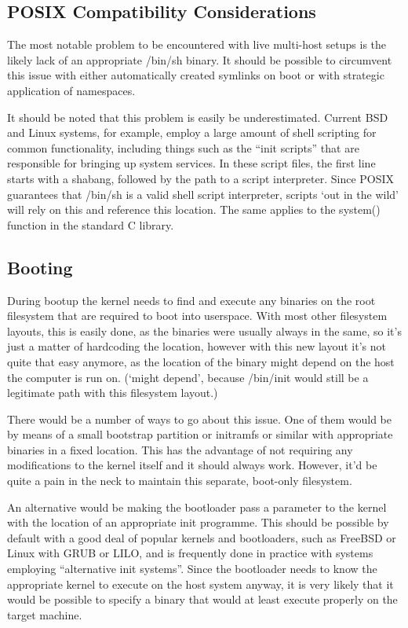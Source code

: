 \documentclass[a4paper,twoside,titlepage]{article}
\begin{document}
\subsection{POSIX Compatibility Considerations}
The most notable problem to be encountered with live multi-host setups is the
likely lack of an appropriate /bin/sh binary. It should be possible to
circumvent this issue with either automatically created symlinks on boot or
with strategic application of namespaces.

It should be noted that this problem is easily be underestimated. Current BSD
and Linux systems, for example, employ a large amount of shell scripting for
common functionality, including things such as the ``init scripts'' that are
responsible for bringing up system services. In these script files, the first
line starts with a shabang, followed by the path to a script interpreter. Since
POSIX guarantees that /bin/sh is a valid shell script interpreter, scripts `out
in the wild' will rely on this and reference this location. The same applies to
the system() function in the standard C library.

\subsection{Booting}
During bootup the kernel needs to find and execute any binaries on the root
filesystem that are required to boot into userspace. With most other filesystem
layouts, this is easily done, as the binaries were usually always in the same,
so it's just a matter of hardcoding the location, however with this new layout
it's not quite that easy anymore, as the location of the binary might depend on
the host the computer is run on. (`might depend', because /bin/init would still
be a legitimate path with this filesystem layout.)

There would be a number of ways to go about this issue. One of them would be
by means of a small bootstrap partition or initramfs or similar with appropriate
binaries in a fixed location. This has the advantage of not requiring any
modifications to the kernel itself and it should always work. However, it'd be
quite a pain in the neck to maintain this separate, boot-only filesystem.

An alternative would be making the bootloader pass a parameter to the kernel
with the location of an appropriate init programme. This should be possible by
default with a good deal of popular kernels and bootloaders, such as FreeBSD or
Linux with GRUB or LILO, and is frequently done in practice with systems
employing ``alternative init systems''. Since the bootloader needs to know the
appropriate kernel to execute on the host system anyway, it is very likely that
it would be possible to specify a binary that would at least execute properly on
the target machine.
\end{document}
